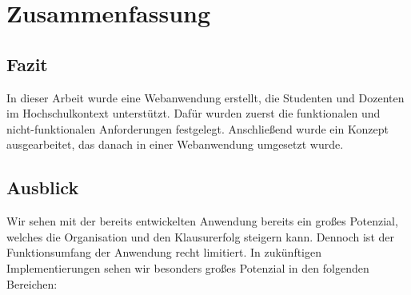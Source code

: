 \chapter{Zusammenfassung}

\section{Fazit} %
In dieser Arbeit wurde eine Webanwendung erstellt, die Studenten und Dozenten im Hochschulkontext unterstützt.
Dafür wurden zuerst die funktionalen und nicht-funktionalen Anforderungen festgelegt.
Anschließend wurde ein Konzept ausgearbeitet, das danach in einer Webanwendung umgesetzt wurde.



\section{Ausblick}
Wir sehen mit der bereits entwickelten Anwendung bereits ein großes Potenzial, welches die Organisation und den Klausurerfolg steigern kann.
Dennoch ist der Funktionsumfang der Anwendung recht limitiert.
In zukünftigen Implementierungen sehen wir besonders großes Potenzial in den folgenden Bereichen:
